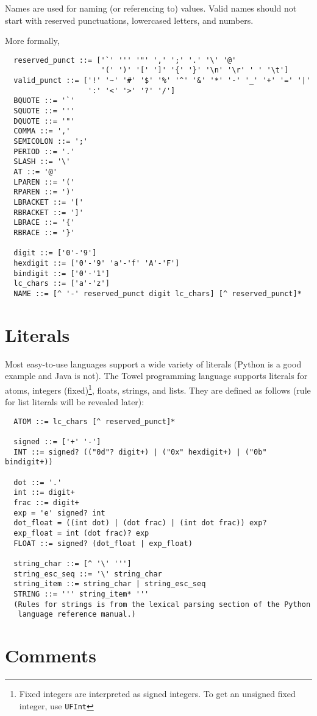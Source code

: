 \documentclass{book}
\begin{document}
Names are used for naming (or referencing to) values. Valid names should not start with reserved punctuations, lowercased letters, and numbers.

More formally,
\begin{verbatim}
  reserved_punct ::= ['`' ''' '"' ',' ';' '.' '\' '@' 
                      '(' ')' '[' ']' '{' '}' '\n' '\r' ' ' '\t']
  valid_punct ::= ['!' '~' '#' '$' '%' '^' '&' '*' '-' '_' '+' '=' '|'
                   ':' '<' '>' '?' '/']
  BQUOTE ::= '`'
  SQUOTE ::= '''
  DQUOTE ::= '"'
  COMMA ::= ','
  SEMICOLON ::= ';'
  PERIOD ::= '.'
  SLASH ::= '\'
  AT ::= '@'
  LPAREN ::= '('
  RPAREN ::= ')'
  LBRACKET ::= '['
  RBRACKET ::= ']'
  LBRACE ::= '{'
  RBRACE ::= '}'

  digit ::= ['0'-'9']
  hexdigit ::= ['0'-'9' 'a'-'f' 'A'-'F']
  bindigit ::= ['0'-'1']
  lc_chars ::= ['a'-'z']
  NAME ::= [^ '-' reserved_punct digit lc_chars] [^ reserved_punct]*
\end{verbatim}

\section{Literals}

Most easy-to-use languages support a wide variety of literals (Python is a good example and Java is not). The Towel programming language supports literals for atoms, integers (fixed)\footnote{Fixed integers are interpreted as signed integers. To get an unsigned fixed integer, use \texttt{UFInt}}, floats, strings, and lists. They are defined as follows (rule for list literals will be revealed later):
\begin{verbatim}
  ATOM ::= lc_chars [^ reserved_punct]*

  signed ::= ['+' '-']
  INT ::= signed? (("0d"? digit+) | ("0x" hexdigit+) | ("0b" bindigit+))

  dot ::= '.'
  int ::= digit+
  frac ::= digit+
  exp = 'e' signed? int
  dot_float = ((int dot) | (dot frac) | (int dot frac)) exp?
  exp_float = int (dot frac)? exp
  FLOAT ::= signed? (dot_float | exp_float)

  string_char ::= [^ '\' ''']
  string_esc_seq ::= '\' string_char
  string_item ::= string_char | string_esc_seq
  STRING ::= ''' string_item* '''
  (Rules for strings is from the lexical parsing section of the Python
   language reference manual.)
\end{verbatim}

\section{Comments}
\end{document}
